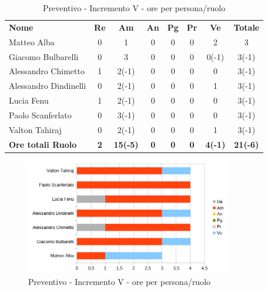 \begin{table} [h!]
	\begin{center}
		\begin{tabular} { m{3.5cm} c c c c c c c }
			\rowcolor{lightgray}
			\textbf{Nome} & \textbf{Re} & \textbf{Am} & \textbf{An} & \textbf{Pg} & \textbf{Pr} & \textbf{Ve} & \textbf{Totale} \\
			Matteo Alba & 0 & 1 & 0 & 0 & 0 & 2 & 3 \\
			Giacomo Bulbarelli & 0 & 3 & 0 & 0 & 0 & 0(-1) & 3(-1) \\
			Alessandro Chimetto & 1 & 2(-1) & 0 & 0 & 0 & 0 & 3(-1)\\
			Alessandro Dindinelli & 0 & 2(-1) & 0 & 0 & 0 & 1 & 3(-1) \\
			Lucia Fenu & 1 & 2(-1) & 0 & 0 & 0 & 0 & 3(-1) \\
			Paolo Scanferlato & 0 & 3(-1) & 0 & 0 & 0 & 0 & 3(-1) \\
			Valton Tahiraj & 0 & 2(-1) & 0 & 0 & 0 & 1 & 3(-1)\\
			\textbf{Ore totali Ruolo} & \textbf{2} & \textbf{15(-5)} & \textbf{0} & \textbf{0} & \textbf{0}& \textbf{4(-1)} & \textbf{21(-6)}
		\end{tabular}
		\caption{Preventivo - Incremento V - ore per persona/ruolo}
	\end{center}
\end{table}
\begin{figure} [h!]
	\centering
	\includegraphics[width=0.8\textwidth]{res/img/grafici/consuntivo-barre- incremento5.png}
	\caption{Preventivo - Incremento V - ore per persona/ruolo} 
\end{figure}

\newpage

